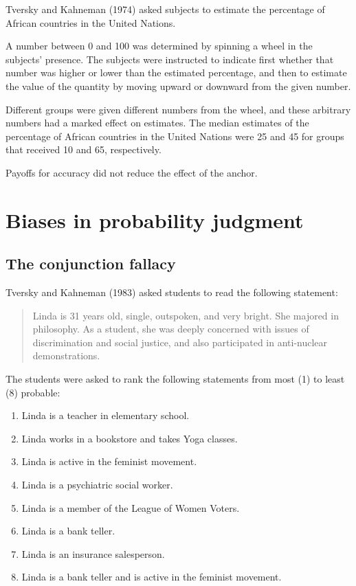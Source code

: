\documentclass[
  letterpaper,
  DIV=11,
  numbers=noendperiod]{scrreprt}
\providecommand{\tightlist}{%
  \setlength{\itemsep}{0pt}\setlength{\parskip}{0pt}}\usepackage{longtable,booktabs,array}
\begin{document}
Tversky and Kahneman (1974) asked subjects to estimate the percentage of
African countries in the United Nations.

A number between 0 and 100 was determined by spinning a wheel in the
subjects' presence. The subjects were instructed to indicate first
whether that number was higher or lower than the estimated percentage,
and then to estimate the value of the quantity by moving upward or
downward from the given number.

Different groups were given different numbers from the wheel, and these
arbitrary numbers had a marked effect on estimates. The median estimates
of the percentage of African countries in the United Nations were 25 and
45 for groups that received 10 and 65, respectively.

Payoffs for accuracy did not reduce the effect of the anchor.

\hypertarget{biases-in-probability-judgment}{%
\chapter{Biases in probability
judgment}\label{biases-in-probability-judgment}}

\hypertarget{the-conjunction-fallacy}{%
\section{The conjunction fallacy}\label{the-conjunction-fallacy}}

Tversky and Kahneman (1983) asked students to read the following
statement:

\begin{quote}
Linda is 31 years old, single, outspoken, and very bright. She majored
in philosophy. As a student, she was deeply concerned with issues of
discrimination and social justice, and also participated in anti-nuclear
demonstrations.
\end{quote}

The students were asked to rank the following statements from most (1)
to least (8) probable:

\begin{enumerate}
\def\labelenumi{\arabic{enumi}.}
\tightlist
\item
  Linda is a teacher in elementary school.
\item
  Linda works in a bookstore and takes Yoga classes.
\item
  Linda is active in the feminist movement.
\item
  Linda is a psychiatric social worker.
\item
  Linda is a member of the League of Women Voters.
\item
  Linda is a bank teller.
\item
  Linda is an insurance salesperson.
\item
  Linda is a bank teller and is active in the feminist movement.
\end{enumerate}
\end{document}
